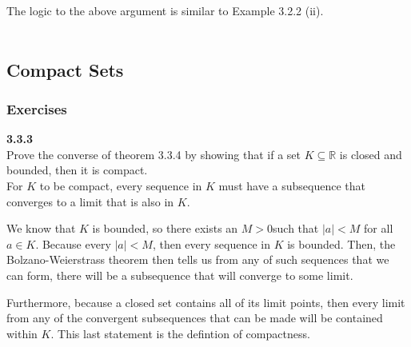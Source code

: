 The logic to the above argument is similar to Example 3.2.2 (ii).
\\~\\







\subsection{Compact Sets}


\subsubsection{Exercises}

\textbf{3.3.3}
\\

Prove the converse of theorem 3.3.4 by showing that if a set $K \subseteq \mathbb{R}$ is closed and bounded,
then it is compact.
\\

For $K$ to be compact, every sequence in $K$ must have a subsequence that converges to a limit that
is also in $K$.

We know that $K$ is bounded, so there exists an $M > 0$such that $|a| < M$ for all $a\in K$.
Because every $|a| < M$, then every sequence in $K$ is bounded.
Then, the Bolzano-Weierstrass theorem then tells us from any of such sequences that we can form, there will be a
subsequence that will converge to some limit.

Furthermore, because a closed set contains all of its limit points, then every limit from any of the
convergent subsequences that can be made will be contained within $K$.
This last statement is the defintion of compactness.
\\~\\